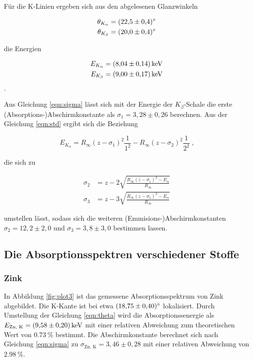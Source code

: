 Für die K-Linien ergeben sich aus den abgelesenen Glanzwinkeln 

\begin{align*}
  \theta_{K_\alpha} &= \SI{22.5 +- 0.4}{\degree} \\
  \theta_{K_\beta} &= \SI{20 +- 0.4}{\degree}
\end{align*}

die Energien 

\begin{align*}
E_{K_\alpha} &= \SI{8.04 +- 0.14}{\kilo\eV} \\
E_{K_\beta} &= \SI{9.00 +- 0.17}{\kilo\eV} 
\end{align*}.

Aus Gleichung \eqref{eqn:sigma} lässt sich mit der Energie der $K_\beta$-Schale
die erste (Absorptions-)Abschirmkonstante als $\sigma_1 = 3,28 \pm 0,26$ berechnen. Aus der Gleichung
\eqref{eqn:std} ergibt sich die Beziehung

\begin{equation}
  E_{K_\alpha} = R_\infty (z - \sigma_1)^2 \frac{1}{1^2} - R_\infty (z - \sigma_2)^2 \frac{1}{2^2}  \; \text{,}
\end{equation}

die sich zu

\begin{align}
  \sigma_2 &= z - 2 \sqrt{\frac{R_\infty (z - \sigma_1)^2 - E_\alpha}{R_\infty}} \\
  \sigma_3 &= z - 3 \sqrt{\frac{R_\infty (z - \sigma_1)^2 - E_\alpha}{R_\infty}}
\end{align}

umstellen lässt, sodass sich die weiteren (Emmisions-)Abschirmkonstanten
$\sigma_2 = 12,2 \pm 2,0$ und $\sigma_3 = 3,8 \pm 3,0$ bestimmen lassen.

\subsection{Die Absorptionsspektren verschiedener Stoffe}

\subsubsection{Zink}

In Abbildung \ref{fig:plot3} ist das gemessene Absorptionsspektrum von Zink abgebildet.
Die K-Kante ist bei etwa $\SI{18.75 +- 0.40}{\degree}$ lokalisiert. Durch Umstellung 
der Gleichung \eqref{eqn:theta} wird die Absorptionssenergie als 
$ E_\text{Zn, K} = \SI{9.58 +- 0.20}{\kilo\eV}$ mit einer relativen Abweichung
zum theoretischen Wert von $\SI{0.73}{\percent}$ bestimmt. Die Abschirmkonstante
berechnet sich nach Gleichung \eqref{eqn:sigma} zu $\sigma_\text{Zn, K} = 3,46 \pm 0,28$
mit einer relativen Abweichung von $\SI{2.98}{\percent}$.

